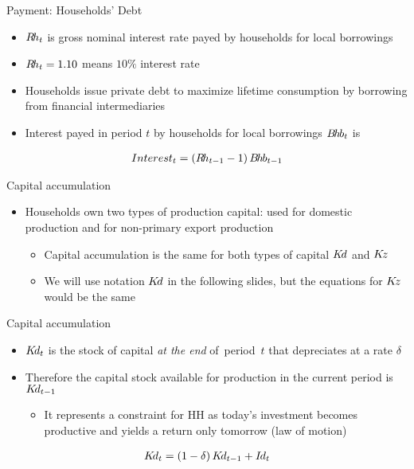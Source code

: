 \stopframecont

\begin{frame}{Payment: Households' Debt}
  \small
  \begin{itemize}
    \item $R\hspace{-0.15em}h_{t}$ is gross nominal interest rate payed by households for local borrowings
    \item $R\hspace{-0.15em}h_{t} = 1.10$ means $10\%$ interest rate
    \item Households issue private debt to maximize lifetime consumption by borrowing from financial intermediaries
    \item Interest payed in period $t$ by households for local borrowings $B\hspace{-0.15em}h\hspace{-0.075em}b_{t}$ is 
  \end{itemize} 
  \vspace*{-2ex}
  \begin{gather*}
    Interest_t  = \left( R\hspace{-0.15em}h_{t-1}-1 \right) B\hspace{-0.15em}h\hspace{-0.075em}b_{t-1} 
  \end{gather*}
  
\end{frame}


\startframecont

\begin{frame}{Capital accumulation}
  \begin{itemize}
    \item Households own two types of production capital: used for domestic production and for non-primary export production
    \begin{itemize} 
      \item Capital accumulation is the same for both types of capital $K\hspace{-0.15em}d$ and $K\hspace{-0.15em}z$ 
      \item We will use notation $K\hspace{-0.15em}d$ in the following slides, but the equations for $K\hspace{-0.15em}z$ would be the same
    \end{itemize}
  \end{itemize}
\end{frame}

\begin{frame}{Capital accumulation}
  \begin{itemize}
    \item $K\hspace{-0.15em}d_t$ is the stock of capital \emph{at the end} of~period~$t$ that depreciates at a rate $\delta$
    \item Therefore the capital stock available for production in the current period is $K\hspace{-0.15em}d_{t-1}$
    \begin{itemize}
      \item It represents a constraint for HH as today's investment becomes productive and yields a return only tomorrow (law of motion)
    \end{itemize}
  \end{itemize}
  \vspace*{-2ex}
  \begin{gather*}
    K\hspace{-0.15em}d_{t} = \left(1 - \delta \right) K\hspace{-0.15em}d_{t-1} + I\hspace{-0.1em}d_t
  \end{gather*}
\end{frame} 

